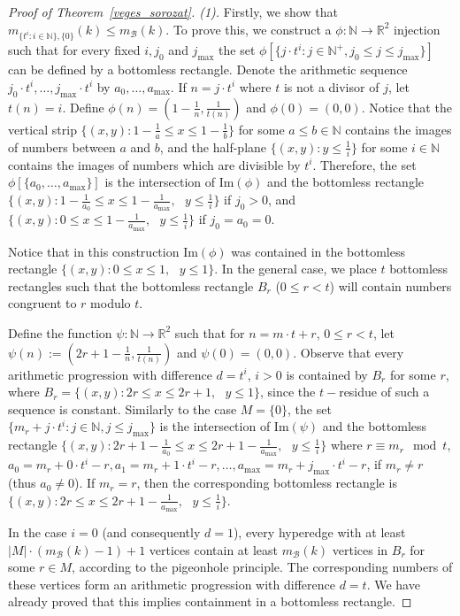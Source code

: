 \documentclass[11pt,oneside]{amsart}
\begin{document}
\begin{proof} [Proof of Theorem~\ref{veges_sorozat}. (1)]
Firstly, we show that $m_{\{t^i:i \in \mathbb{N}\}, \{0\}}(k) \leq m_{\mathcal{B}}(k)$. To prove this, we construct a $\phi:\mathbb{N}\to \mathbb{R}^2$ injection such that for every fixed $i, j_0$ and $j_{\text{max}}$ the set $\phi[\{j \cdot t^i: j \in \mathbb{N}^+, j_0 \leq j \leq j_{\text{max}}\}]$ can be defined by a bottomless rectangle. Denote the arithmetic sequence $j_0 \cdot t^i, \ldots, j_{\text{max}} \cdot t^i$ by $a_0, \ldots, a_{\text{max}}$. If $n = j \cdot t^i$ where $t$ is not a divisor of $j$, let $t(n) = i$. Define $\phi(n)= (1- \frac{1}{n}, \frac{1}{t(n)})$ and $\phi(0)=(0,0)$. Notice that the vertical strip $\{(x,y): 1-\frac{1}{a} \leq x \leq 1-\frac{1}{b}\}$ for some $a \leq b \in \mathbb{N}$ contains the images of numbers between $a$ and $b$, and the half-plane $\{(x,y): y \leq \frac{1}{i}\}$ for some $i \in \mathbb{N}$ contains the images of numbers which are divisible by $t^i$. Therefore, the set $\phi[\{a_0, \ldots, a_{\text{max}}\}]$ is the intersection of {\rm Im}$(\phi)$ and the bottomless rectangle $\{(x,y): 1-\frac {1}{a_0} \leq x \leq 1- \frac {1}{a_{\text{max}}}, \text{ } y \leq \frac{1}{i}\}$ if $j_0>0$, and $\{(x,y): 0 \leq x \leq 1- \frac {1}{a_{\text{max}}}, \text{ } y \leq \frac{1}{i}\}$ if $j_0=a_0=0$.

Notice that in this construction {\rm Im}$(\phi)$ was contained in the bottomless rectangle $\{(x,y): 0 \leq x \leq 1, \text{ } y \leq 1\}$. In the general case, we place $t$ bottomless rectangles such that the bottomless rectangle $B_r$ ($0 \leq r < t$) will contain numbers congruent to $r$ modulo $t$. 

Define the function $\psi: \mathbb{N} \to \mathbb{R}^2$ such that for $n=m\cdot t+r$, $0 \leq r<t$, let $\psi(n):= (2r+1-\frac{1}{n}, \frac{1}{t(n)})$ and $\psi(0)=(0,0)$. Observe that every arithmetic progression with difference $d=t^i$, $i>0$ is contained by $B_r$ for some $r$, where $B_r = \{(x,y): 2r \leq x \leq 2r+1, \text{ } y \leq 1\}$, since the $t-$residue of such a sequence is constant. Similarly to the case $M=\{0\}$, the set $\{m_r + j \cdot t^i: j \in \mathbb{N}, j \leq j_{\text{max}}\}$ is the intersection of {\rm Im}$(\psi)$ and the bottomless rectangle $\{(x,y): 2r+1- \frac {1}{a_0} \leq x \leq 2r+1- \frac {1}{a_{\text{max}}}, \text{ } y \leq \frac{1}{i}\}$ where $r \equiv m_r \mod t$, $a_0 = m_r + 0 \cdot t^i -r, a_1 = m_r + 1 \cdot t^i- r, \ldots, a_{\text{max}} = m_r + j_{\text{max}} \cdot t^i -r$, if $m_r \neq r$ (thus $a_0 \neq 0$). If $m_r=r$, then the corresponding bottomless rectangle is $\{(x,y): 2r \leq x \leq 2r+1- \frac {1}{a_{\text{max}}}, \text{ } y \leq \frac{1}{i}\}$. 

In the case $i=0$ (and consequently $d=1$), every hyperedge with at least $|M|\cdot(m_{\mathcal{B}}(k) -1)+1$ vertices  
contain at least $m_{\mathcal{B}}(k)$ vertices in $B_r$ for some $r\in M$, according to the pigeonhole principle. The corresponding numbers of these vertices form an arithmetic progression with difference $d=t$. We have already proved that this implies containment in a bottomless rectangle.
\end{proof}
\end{document}
